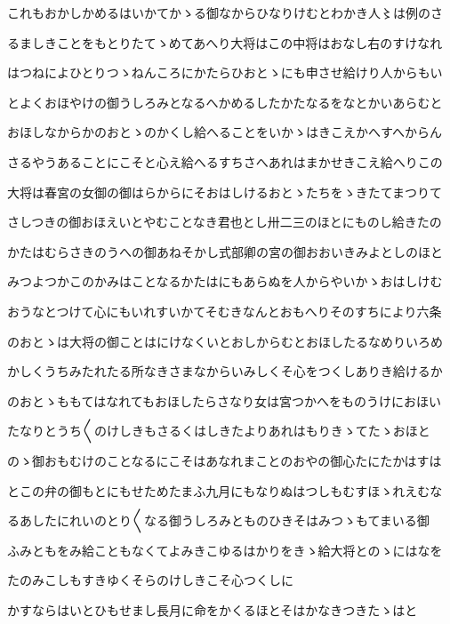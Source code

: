\documentclass[a4paper,11pt,landscape]{ltjtarticle}
\begin{document}
\par\medskip
これもおかしかめるはいかてかゝる御なからひなりけむとわかき人〻は例のさ
\par\medskip
るましきことをもとりたてゝめてあへり大将はこの中将はおなし右のすけなれ
\par\medskip
はつねによひとりつゝねんころにかたらひおとゝにも申させ給けり人からもい
\par\medskip
とよくおほやけの御うしろみとなるへかめるしたかたなるをなとかいあらむと
\par\medskip
おほしなからかのおとゝのかくし給へることをいかゝはきこえかへすへからん
\par\medskip
さるやうあることにこそと心え給へるすちさへあれはまかせきこえ給へりこの
\par\medskip
大将は春宮の女御の御はらからにそおはしけるおとゝたちをゝきたてまつりて
\par\medskip
さしつきの御おほえいとやむことなき君也とし卅二三のほとにものし給きたの
\par\medskip
かたはむらさきのうへの御あねそかし式部卿の宮の御おおいきみよとしのほと
\par\medskip
みつよつかこのかみはことなるかたはにもあらぬを人からやいかゝおはしけむ
\par\medskip
おうなとつけて心にもいれすいかてそむきなんとおもへりそのすちにより六条
\par\medskip
のおとゝは大将の御ことはにけなくいとおしからむとおほしたるなめりいろめ
\par\medskip
かしくうちみたれたる所なきさまなからいみしくそ心をつくしありき給けるか
\par\medskip
のおとゝももてはなれてもおほしたらさなり女は宮つかへをものうけにおほい
\par\medskip
たなりとうち〱のけしきもさるくはしきたよりあれはもりきゝてたゝおほと
\par\medskip
のゝ御おもむけのことなるにこそはあなれまことのおやの御心たにたかはすは
\par\medskip
とこの弁の御もとにもせためたまふ九月にもなりぬはつしもむすほゝれえむな
\par\medskip
るあしたにれいのとり〱なる御うしろみとものひきそはみつゝもてまいる御
\par\medskip
ふみともをみ給こともなくてよみきこゆるはかりをきゝ給大将とのゝにはなを
\par\medskip
たのみこしもすきゆくそらのけしきこそ心つくしに
\par\medskip
かすならはいとひもせまし長月に命をかくるほとそはかなきつきたゝはと
\par\medskip
\end{document}

